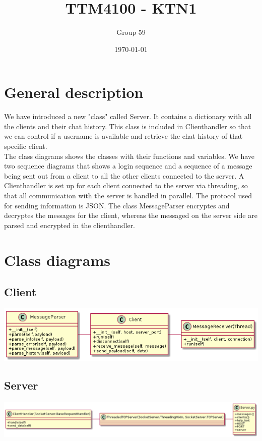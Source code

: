 \documentclass[11pt]{article}
\author{Group 59}
\date{\today}
\title{TTM4100 - KTN1}
\begin{document}
\maketitle
\tableofcontents

\section{General description}
\label{sec-1}
We have introduced a new "class" called Server. It contains a dictionary with all
the clients and their chat history. This class is included in Clienthandler so
 that we can control if a username is available and retrieve the chat history of
 that specific client.
\\
The class diagrams shows the classes with their functions and variables. We have
 two sequence diagrams that shows a login sequence and a sequence of a message
 being sent out from a client to all the other clients connected to the server.
 A Clienthandler is set up for each client connected to the server via
 threading, so that all communication with the server is handled in parallel.
 The protocol used for sending information is JSON. The class MessageParser
 encryptes and decryptes the messages for the client, whereas the messaged on
 the server side are parsed and encrypted in the clienthandler.
\section{Class diagrams}
\label{sec-2}
\subsection{Client}
\label{sec-2-1}
\includegraphics[width=.9\linewidth]{client_class.png}

\subsection{Server}
\label{sec-2-2}
\includegraphics[width=.9\linewidth]{server_class.png}
\end{document}
